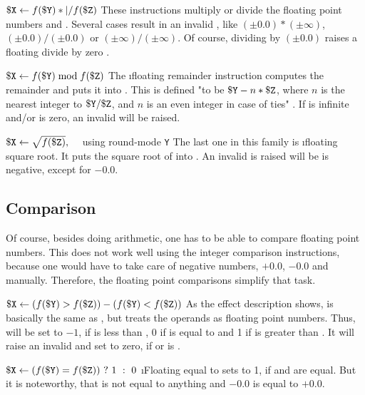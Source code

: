 \instrtbl
	{}
	{${\tt \$X} \leftarrow f({\tt \$Y}) *|/ f({\tt \$Z})$}
\noindent These instructions multiply or divide the floating point numbers  and . Several cases result in an invalid , like $(\pm 0.0)*(\pm \infty)$, $(\pm 0.0)/(\pm 0.0)$ or $(\pm \infty)/(\pm \infty)$. Of course, dividing by $(\pm 0.0)$ raises a floating divide by zero . \citep[pg. 16]{mmix-doc}

\instrtbl
	{}
	{${\tt \$X} \leftarrow f({\tt \$Y}) \bmod f({\tt \$Z})$}
\noindent The \i{floating remainder} instruction computes the remainder and puts it into . This is defined "to be ${\tt \$Y} - n * {\tt \$Z}$, where $n$ is the nearest integer to ${\tt \$Y}/{\tt \$Z}$, and $n$ is an even integer in case of ties" \citep[pg. 16]{mmix-doc}. If  is infinite and/or  is zero, an invalid  will be raised. \citep[pg. 16]{mmix-doc}

\instrtbl
	{}
	{${\tt \$X} \leftarrow \sqrt{f({\tt \$Z})},\quad$ using round-mode {\tt Y}}
\noindent The last one in this family is \i{floating square root}. It puts the square root of  into . An invalid  is raised will be  is negative, except for $-0.0$. \citep[pg. 17]{mmix-doc}

\subsection{Comparison}

Of course, besides doing arithmetic, one has to be able to compare floating point numbers. This does not work well using the integer comparison instructions, because one would have to take care of negative numbers, $+0.0$, $-0.0$ and \NaN manually. Therefore, the floating point comparisons simplify that task.

\instrtbl
	{}
	{${\tt \$X} \leftarrow (f({\tt \$Y}) > f({\tt \$Z})) - (f({\tt \$Y}) < f({\tt \$Z}))$}
\noindent As the effect description shows,  is basically the same as , but treats the operands as floating point numbers. Thus,  will be set to $-1$, if  is less than , 0 if  is equal to  and 1 if  is greater than . It will raise an invalid  and set  to zero, if  or  is \NaN. \citep[pg. 17]{mmix-doc}

\instrtbl
	{}
	{${\tt \$X} \leftarrow (f({\tt \$Y}) = f({\tt \$Z}))~?~1~:~0$}
\noindent \i{Floating equal to} sets  to 1, if  and  are equal. But it is noteworthy, that \NaN is not equal to anything and $-0.0$ is equal to $+0.0$. \citep[pg. 17]{mmix-doc}


